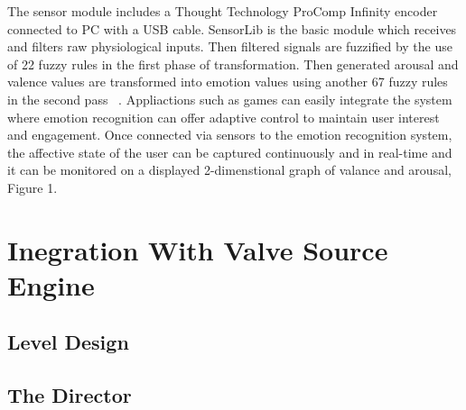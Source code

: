 The sensor module includes a Thought Technology ProComp Infinity
encoder ~\cite{tt2013procomp} connected to PC with a USB cable.
SensorLib is the basic module which receives and filters raw
physiological inputs. Then filtered signals are fuzzified by
the use of 22 fuzzy rules in the first phase of transformation.
Then generated arousal and valence values are transformed into
emotion values using another 67 fuzzy rules in
the second pass ~\cite{mandryk2007fuzzy}. Appliactions such as games can easily
integrate the system where emotion recognition can offer
adaptive control to maintain user interest and engagement.
Once connected via sensors to the emotion recognition system,
the affective state of the user can be captured continuously and
in real-time and it can be monitored on a displayed
2-dimenstional graph of valance and arousal, Figure 1.

\section{Inegration With Valve Source Engine}
\subsection{Level Design}
\subsection{The Director}
